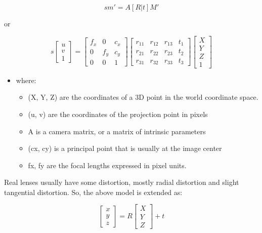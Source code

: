 \documentclass[12pt, a4paper, font = Times New Roman]{article}
\begin{document}
\begin{equation}\label{eq:1}
	s m' = A[R|t]M'
\end{equation}

or

\begin{equation}\label{eq:2}
	s 
\left[\begin{matrix}
u\\
v\\
1
\end{matrix}\right] = 
\left[\begin{matrix}
f_x & 0 & c_x\\
0 & f_y & c_y\\
0 & 0 & 1
\end{matrix}\right]
\left[\begin{matrix}
r_{11} & r_{12} & r_{13} & t_1\\
r_{21} & r_{22} & r_{23} & t_2\\
r_{31} & r_{32} & r_{33} & t_3
\end{matrix}\right]
\left[\begin{matrix}
X\\
Y\\
Z\\
1
\end{matrix}\right]
\end{equation}

\begin{itemize}
\item where:
\begin{itemize}
	\item (X, Y, Z) are the coordinates of a 3D point in the world coordinate space.
	\item (u, v) are the coordinates of the projection point in pixels
	\item A is a camera matrix, or a matrix of intrinsic parameters
	\item (cx, cy) is a principal point that is usually at the image center
	\item fx, fy are the focal lengths expressed in pixel units.
\end{itemize}
\end{itemize}

Real lenses usually have some distortion, mostly radial distortion and slight tangential distortion. So, the above model is extended as:

\begin{equation}\label{eq:3}
\left[\begin{matrix}
x\\
y\\
z
\end{matrix}\right] = 
R
\left[\begin{matrix}
X\\
Y\\
Z
\end{matrix}\right]
+ t
\end{equation}
\end{document}

